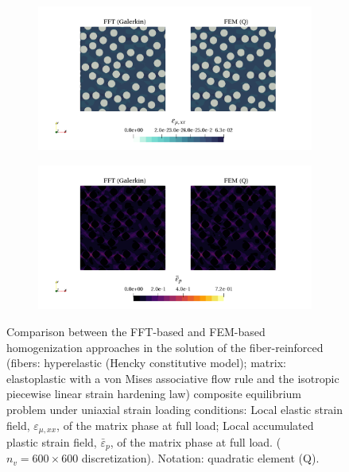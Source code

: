 \begin{figure}[hbt]
  \centering
	\begin{subfigure}[b]{\textwidth}
    \centering
    \includegraphics[width=\textwidth]{figures/von_mises_res_mat_large_strain_2D_normal_elastic_strain_11}
    \caption{}
    \label{subfig:von_mises_res_mat_large_strain_2D_normal_elastic_strain_11}
  \end{subfigure}
  \begin{subfigure}[b]{\textwidth}
    \centering
    \includegraphics[width=\textwidth]{figures/von_mises_res_mat_large_strain_2D_normal_palstic_strain_11}
    \caption{}
    \label{subfig:von_mises_res_mat_large_strain_2D_normal_palstic_strain_11}
  \end{subfigure}
  \caption{Comparison between the FFT-based and FEM-based homogenization approaches in the
  solution of the fiber-reinforced (fibers: hyperelastic (Hencky constitutive model); matrix: elastoplastic with a von Mises associative flow rule and the isotropic piecewise linear strain hardening law) composite equilibrium problem under uniaxial
  strain loading conditions:  Local elastic strain field, \(\varepsilon_{\mu,xx}\), of the matrix phase at full load;  Local accumulated plastic strain field, \(\bar{\varepsilon}_{p}\), of the matrix phase at full load.  (\(n_v = 600 \times 600\) discretization). Notation: quadratic element (Q).}
\label{fig:von_mises_res_mat_large_strain_2D_normal_local_fields}
\end{figure}

